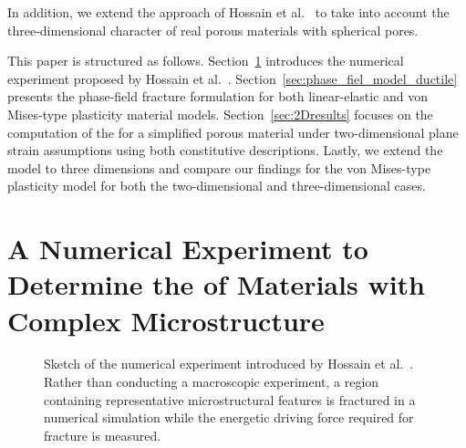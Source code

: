 \documentclass[pdflatex,sn-mathphys-num]{sn-jnl}%
\theoremstyle{thmstyleone}%
\theoremstyle{thmstyletwo}%
\theoremstyle{thmstylethree}%
\begin{document}
In addition, we extend the approach of Hossain et al.~\cite{hossain_effective_2014} to take into account the three-dimensional
character of real porous materials with spherical pores.

This paper is structured as follows.
Section~\ref{sec:numericalExperiment} introduces the numerical experiment
proposed by Hossain et al.~\cite{hossain_effective_2014}.
Section~\ref{sec:phase_fiel_model_ductile} presents the phase-field
fracture formulation for both linear-elastic and von Mises-type plasticity material models.
Section~\ref{sec:2Dresults} focuses on the computation
of the  for a simplified porous material
under two-dimensional plane strain assumptions
 using both constitutive descriptions.
Lastly, we extend the model to three dimensions and compare our findings for the von Mises-type plasticity model
for both the two-dimensional and three-dimensional cases.




\section{A Numerical Experiment to Determine the 
 of Materials with Complex Microstructure}
\label{sec:numericalExperiment}


\begin{figure}[htb]
    \centering
    \resizebox{0.6\textwidth}{!}{}
    \caption{%
        Sketch of the numerical experiment introduced by Hossain et al.~\cite{hossain_effective_2014}. 
        Rather than conducting a macroscopic experiment, a region containing representative microstructural features is fractured in a numerical simulation while the energetic driving force required for fracture is measured.
    }
    \label{fig:numerical_experiment}
\end{figure}
\end{document}
